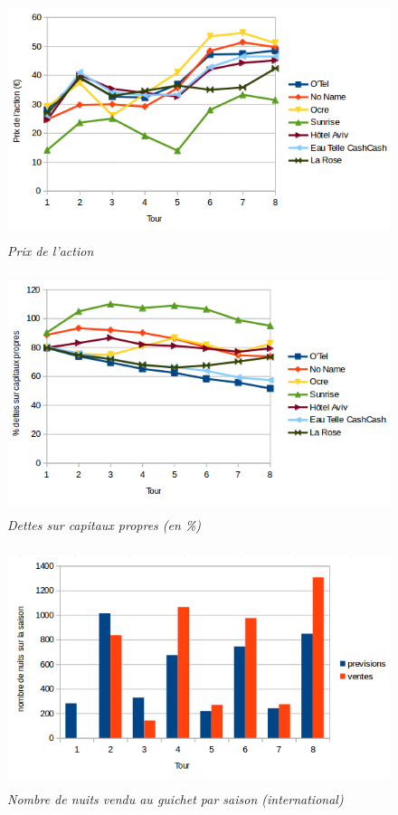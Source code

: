 \documentclass[a4paper,10pt]{article}
\begin{document}
    \begin{figure}[!ht]
      \begin{center}
	\includegraphics[height=7cm,keepaspectratio]{./images/action.png}
      \end{center}
      \caption{\textit{Prix de l'action}}
    \end{figure}
        
    \begin{figure}[!ht]
      \begin{center}
	\includegraphics[height=7.0cm,keepaspectratio]{./images/dettes_capitaux.png}
      \end{center}
      \caption{\textit{Dettes sur capitaux propres (en \%)}}
    \end{figure}
    
    \begin{figure}[!ht]
      \begin{center}
	\includegraphics[height=7.0cm,keepaspectratio]{./images/ventes_internationales.png}
      \end{center}
      \caption{\textit{Nombre de nuits vendu au guichet par saison (international)}}
      \label{ventes_internationales}
    \end{figure}
    
\end{document}
